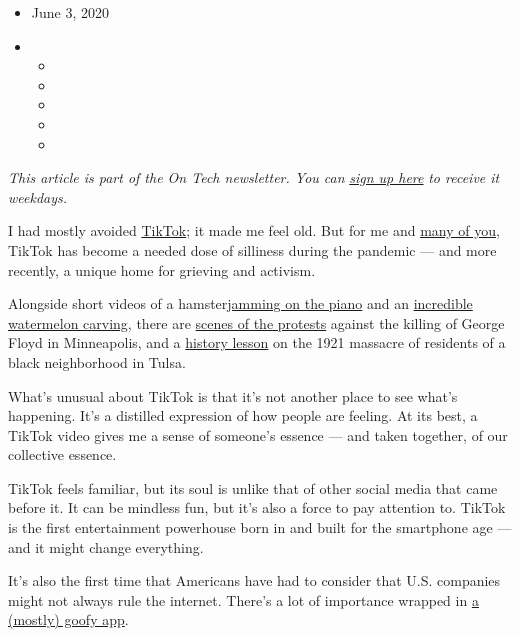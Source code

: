 \begin{itemize}
\item
  June 3, 2020
\item
  \begin{itemize}
  \item
  \item
  \item
  \item
  \item
  \end{itemize}
\end{itemize}

\emph{This article is part of the On Tech newsletter. You can}
\href{https://www.nytimes3xbfgragh.onion/newsletters/signup/OT}{\emph{sign
up here}} \emph{to receive it weekdays.}

I had mostly avoided
\href{https://www.nytimes3xbfgragh.onion/2020/07/26/technology/tiktok-china-ban-model.html}{TikTok};
it made me feel old. But for me and
\href{https://www.cnn.com/2020/05/05/tech/tiktok-bytedance-coronavirus-intl-hnk/index.html}{many
of you}, TikTok has become a needed dose of silliness during the
pandemic --- and more recently, a unique home for grieving and activism.

Alongside short videos of a
hamster\href{https://www.tiktok.com/@hamstarz/video/6829822490131434757}{jamming
on the piano} and an
\href{https://www.tiktok.com/@cakelover363/video/6824418668445846789?lang=en}{incredible
watermelon carving}, there are
\href{https://www.tiktok.com/@kareemrahma/video/6831762210218446085?lang=US}{scenes
of the protests} against the killing of George Floyd in Minneapolis, and
a
\href{https://www.tiktok.com/@theleftistdude/video/6826796142299254021}{history
lesson} on the 1921 massacre of residents of a black neighborhood in
Tulsa.

What's unusual about TikTok is that it's not another place to see what's
happening. It's a distilled expression of how people are feeling. At its
best, a TikTok video gives me a sense of someone's essence --- and taken
together, of our collective essence.

TikTok feels familiar, but its soul is unlike that of other social media
that came before it. It can be mindless fun, but it's also a force to
pay attention to. TikTok is the first entertainment powerhouse born in
and built for the smartphone age --- and it might change everything.

It's also the first time that Americans have had to consider that U.S.
companies might not always rule the internet. There's a lot of
importance wrapped in
\href{https://www.nytimes3xbfgragh.onion/2019/03/10/style/what-is-tik-tok.html}{a
(mostly) goofy app}.

